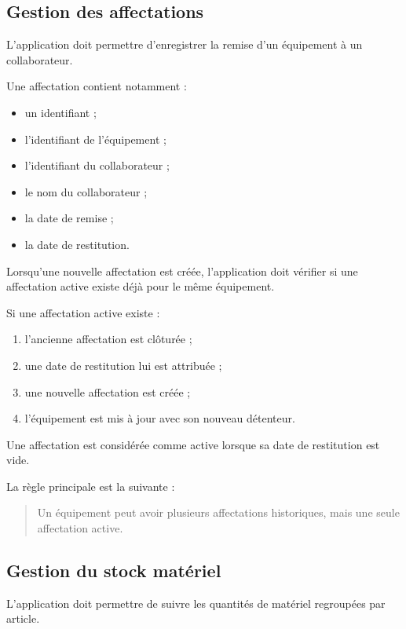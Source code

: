 \documentclass{rapportENSIAS}
\begin{document}
\subsection{Gestion des affectations}

L’application doit permettre d’enregistrer la remise d’un équipement à un collaborateur.

Une affectation contient notamment :

\begin{itemize}
\item un identifiant ;
\item l’identifiant de l’équipement ;
\item l’identifiant du collaborateur ;
\item le nom du collaborateur ;
\item la date de remise ;
\item la date de restitution.
\end{itemize}

Lorsqu’une nouvelle affectation est créée, l’application doit vérifier si une affectation active existe déjà pour le même équipement.

Si une affectation active existe :

\begin{enumerate}
\item l’ancienne affectation est clôturée ;
\item une date de restitution lui est attribuée ;
\item une nouvelle affectation est créée ;
\item l’équipement est mis à jour avec son nouveau détenteur.
\end{enumerate}

Une affectation est considérée comme active lorsque sa date de restitution est vide.

La règle principale est la suivante :

\begin{quote}
Un équipement peut avoir plusieurs affectations historiques, mais une seule affectation active.
\end{quote}

\subsection{Gestion du stock matériel}

L’application doit permettre de suivre les quantités de matériel regroupées par article.
\end{document}

